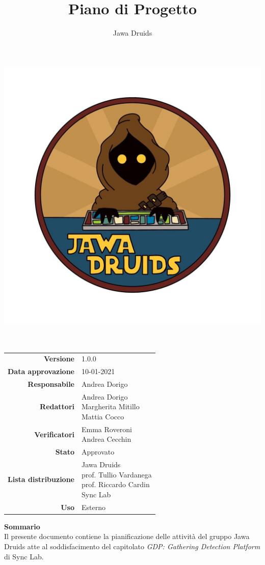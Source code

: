 




\makeatletter
\begin{titlepage}
	\begin{center}
		\vspace*{-5cm}
		\author{Jawa Druids}
		\title{Piano di Progetto}
		\date{} %
		\includegraphics[width=0.5\linewidth]{../immagini/DRUIDSLOGO.jpg}\\[4ex]
		{\huge \bfseries  \@title }\\[2ex]
		{\LARGE  \@author}\\[50ex]
		\vspace*{-9cm}
		\begin{table}[H]
			\renewcommand{\arraystretch}{1.4}
			\centering
			\begin{tabular}{r | l}
				\textbf{Versione} & 1.0.0 \\%
				\textbf{Data approvazione} & 10-01-2021\\
				\textbf{Responsabile} & Andrea Dorigo\\
				\textbf{Redattori} & \makecell[tl]{Andrea Dorigo \\ Margherita Mitillo \\ Mattia Cocco} \\
				\textbf{Verificatori} & \makecell[tl]{Emma Roveroni \\ Andrea Cecchin} \\
				\textbf{Stato} & Approvato\\
				\textbf{Lista distribuzione} & \makecell[tl]{Jawa Druids \\ prof. Tullio Vardanega \\ prof. Riccardo Cardin \\ Sync Lab}\\
				\textbf{Uso} & Esterno
			\end{tabular}
		\end{table}
		\vspace{0.1cm}
		\hfill \break
		\fontsize{17}{10}\textbf{Sommario} \\
		\vspace{0.1cm}
    Il presente documento contiene la pianificazione delle attività del gruppo Jawa Druids atte al soddisfacimento del capitolato \normalsize\textit{GDP: Gathering Detection Platform} di Sync Lab.
	\end{center}
\end{titlepage}
\makeatother

